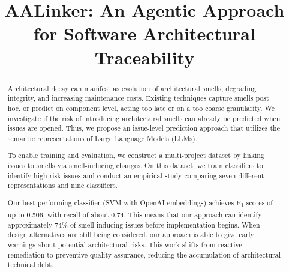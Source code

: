 \documentclass[conference]{IEEEtran}
\begin{document}

\renewcommand{\sectionautorefname}{Section}
\renewcommand{\subsectionautorefname}{Section}
\renewcommand{\subsubsectionautorefname}{Section}
\newcommand{\fone}{F\textsubscript{1}\xspace}

\title{AALinker: An Agentic Approach for Software Architectural Traceability}

\author{}


\maketitle

\begin{abstract}
Architectural decay can manifest as evolution of architectural smells, degrading integrity, and increasing maintenance costs.
Existing techniques capture smells post hoc, or predict on component level, acting too late or on a too coarse granularity. 
We investigate if the risk of introducing architectural smells can already be predicted when issues are opened.
Thus, we propose an issue-level prediction approach that utilizes the semantic representations of Large Language Models (LLMs).

To enable training and evaluation, we construct a multi-project dataset by linking issues to smells via smell-inducing changes.
On this dataset, we train classifiers to identify high-risk issues and conduct an empirical study comparing seven different representations and nine classifiers.

Our best performing classifier (SVM with OpenAI embeddings) achieves F\textsubscript{1}-scores of up to 0.506, with recall of about 0.74.
This means that our approach can identify approximately 74\% of smell-inducing issues before implementation begins.
When design alternatives are still being considered. our approach is able to give early warnings about potential architectural risks.  
This work shifts from reactive remediation to preventive quality assurance, reducing the accumulation of architectural technical debt.

\end{abstract}
\end{document}

